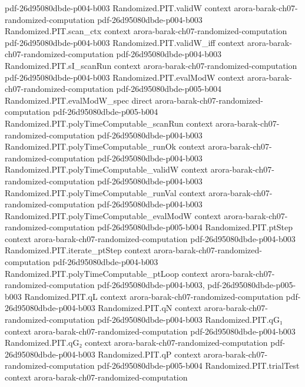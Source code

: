 \begin{theorem}
  {pdf-26d95080dbde-p004-b003}
\proofstep
  {Randomized.PIT.validW}
  {context}
  {arora-barak-ch07-randomized-computation}
  {pdf-26d95080dbde-p004-b003}
\proofstep
  {Randomized.PIT.scan_ctx}
  {context}
  {arora-barak-ch07-randomized-computation}
  {pdf-26d95080dbde-p004-b003}
\proofstep
  {Randomized.PIT.validW_iff}
  {context}
  {arora-barak-ch07-randomized-computation}
  {pdf-26d95080dbde-p004-b003}
\proofstep
  {Randomized.PIT.sI_scanRun}
  {context}
  {arora-barak-ch07-randomized-computation}
  {pdf-26d95080dbde-p004-b003}
\proofstep
  {Randomized.PIT.evalModW}
  {context}
  {arora-barak-ch07-randomized-computation}
  {pdf-26d95080dbde-p005-b004}
\proofstep
  {Randomized.PIT.evalModW_spec}
  {direct}
  {arora-barak-ch07-randomized-computation}
  {pdf-26d95080dbde-p005-b004}
\proofstep
  {Randomized.PIT.polyTimeComputable_scanRun}
  {context}
  {arora-barak-ch07-randomized-computation}
  {pdf-26d95080dbde-p004-b003}
\proofstep
  {Randomized.PIT.polyTimeComputable_runOk}
  {context}
  {arora-barak-ch07-randomized-computation}
  {pdf-26d95080dbde-p004-b003}
\proofstep
  {Randomized.PIT.polyTimeComputable_validW}
  {context}
  {arora-barak-ch07-randomized-computation}
  {pdf-26d95080dbde-p004-b003}
\proofstep
  {Randomized.PIT.polyTimeComputable_runVal}
  {context}
  {arora-barak-ch07-randomized-computation}
  {pdf-26d95080dbde-p004-b003}
\proofstep
  {Randomized.PIT.polyTimeComputable_evalModW}
  {context}
  {arora-barak-ch07-randomized-computation}
  {pdf-26d95080dbde-p005-b004}
\proofstep
  {Randomized.PIT.ptStep}
  {context}
  {arora-barak-ch07-randomized-computation}
  {pdf-26d95080dbde-p004-b003}
\proofstep
  {Randomized.PIT.iterate_ptStep}
  {context}
  {arora-barak-ch07-randomized-computation}
  {pdf-26d95080dbde-p004-b003}
\proofstep
  {Randomized.PIT.polyTimeComputable_ptLoop}
  {context}
  {arora-barak-ch07-randomized-computation}
  {pdf-26d95080dbde-p004-b003,
    pdf-26d95080dbde-p005-b003}
\proofstep
  {Randomized.PIT.qL}
  {context}
  {arora-barak-ch07-randomized-computation}
  {pdf-26d95080dbde-p004-b003}
\proofstep
  {Randomized.PIT.qN}
  {context}
  {arora-barak-ch07-randomized-computation}
  {pdf-26d95080dbde-p004-b003}
\proofstep
  {Randomized.PIT.qG₁}
  {context}
  {arora-barak-ch07-randomized-computation}
  {pdf-26d95080dbde-p004-b003}
\proofstep
  {Randomized.PIT.qG₂}
  {context}
  {arora-barak-ch07-randomized-computation}
  {pdf-26d95080dbde-p004-b003}
\proofstep
  {Randomized.PIT.qP}
  {context}
  {arora-barak-ch07-randomized-computation}
  {pdf-26d95080dbde-p005-b004}
\proofstep
  {Randomized.PIT.trialTest}
  {context}
  {arora-barak-ch07-randomized-computation}

\end{theorem}

